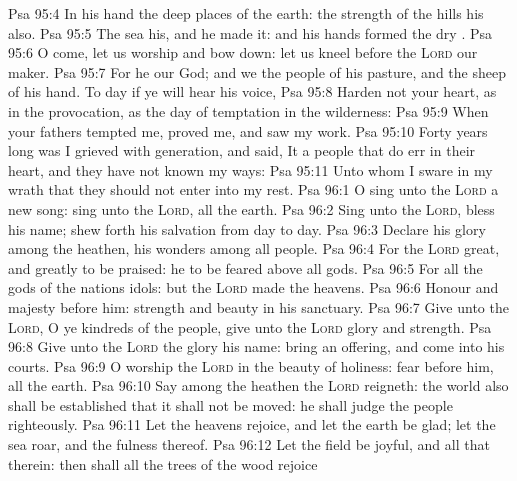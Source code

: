 \vs Psa 95:4 In his hand  the deep places of the earth: the strength of the hills  his also.
\vs Psa 95:5 The sea  his, and he made it: and his hands formed the dry .
\vs Psa 95:6 O come, let us worship and bow down: let us kneel before the \textsc{Lord} our maker.
\vs Psa 95:7 For he  our God; and we  the people of his pasture, and the sheep of his hand. To day if ye will hear his voice,
\vs Psa 95:8 Harden not your heart, as in the provocation,  as  the day of temptation in the wilderness:
\vs Psa 95:9 When your fathers tempted me, proved me, and saw my work.
\vs Psa 95:10 Forty years long was I grieved with  generation, and said, It  a people that do err in their heart, and they have not known my ways:
\vs Psa 95:11 Unto whom I sware in my wrath that they should not enter into my rest.
\vs Psa 96:1 O sing unto the \textsc{Lord} a new song: sing unto the \textsc{Lord}, all the earth.
\vs Psa 96:2 Sing unto the \textsc{Lord}, bless his name; shew forth his salvation from day to day.
\vs Psa 96:3 Declare his glory among the heathen, his wonders among all people.
\vs Psa 96:4 For the \textsc{Lord}  great, and greatly to be praised: he  to be feared above all gods.
\vs Psa 96:5 For all the gods of the nations  idols: but the \textsc{Lord} made the heavens.
\vs Psa 96:6 Honour and majesty  before him: strength and beauty  in his sanctuary.
\vs Psa 96:7 Give unto the \textsc{Lord}, O ye kindreds of the people, give unto the \textsc{Lord} glory and strength.
\vs Psa 96:8 Give unto the \textsc{Lord} the glory  his name: bring an offering, and come into his courts.
\vs Psa 96:9 O worship the \textsc{Lord} in the beauty of holiness: fear before him, all the earth.
\vs Psa 96:10 Say among the heathen  the \textsc{Lord} reigneth: the world also shall be established that it shall not be moved: he shall judge the people righteously.
\vs Psa 96:11 Let the heavens rejoice, and let the earth be glad; let the sea roar, and the fulness thereof.
\vs Psa 96:12 Let the field be joyful, and all that  therein: then shall all the trees of the wood rejoice
